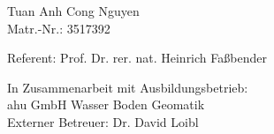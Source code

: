 \documentclass[a4paper,12pt]{scrreprt}
\begin{document}
\begin{titlepage}
	\vspace{1.5cm}
    
	\begin{minipage}[t]{9cm}
		\centering Tuan Anh Cong Nguyen \\ Matr.-Nr.: 3517392
	\end{minipage}
	\vspace{2.1cm}
    
	\centering \begin{minipage}[b]{15cm}
		\centering
			Referent: Prof. Dr. rer. nat. Heinrich Faßbender\\
	\end{minipage}


	\vspace{1.5cm}
	
	\centering %
	\begin{minipage}[b]{10cm}
			\centering
            In Zusammenarbeit mit Ausbildungsbetrieb:\\
            ahu GmbH Wasser Boden Geomatik \\
            \vspace{1cm}
            Externer Betreuer: Dr. David Loibl
            
	\end{minipage}

	\restoregeometry
\end{titlepage}

\clearpage %
\end{document}
